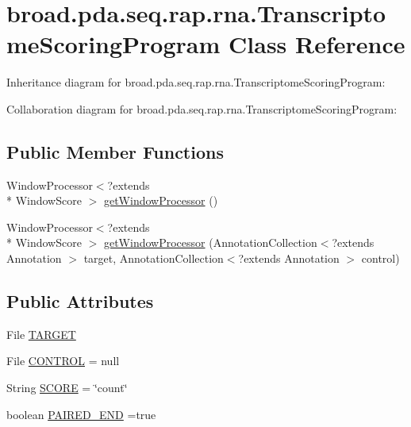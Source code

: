 \hypertarget{classbroad_1_1pda_1_1seq_1_1rap_1_1rna_1_1_transcriptome_scoring_program}{\section{broad.\+pda.\+seq.\+rap.\+rna.\+Transcriptome\+Scoring\+Program Class Reference}
\label{classbroad_1_1pda_1_1seq_1_1rap_1_1rna_1_1_transcriptome_scoring_program}
}


Inheritance diagram for broad.\+pda.\+seq.\+rap.\+rna.\+Transcriptome\+Scoring\+Program\+:


Collaboration diagram for broad.\+pda.\+seq.\+rap.\+rna.\+Transcriptome\+Scoring\+Program\+:
\subsection*{Public Member Functions}
\begin{DoxyCompactItemize}
\item 
Window\+Processor$<$?extends \\*
Window\+Score $>$ \hyperlink{classbroad_1_1pda_1_1seq_1_1rap_1_1rna_1_1_transcriptome_scoring_program_a2b57a53668040cd3a9c9411dc9dce7be}{get\+Window\+Processor} ()
\item 
Window\+Processor$<$?extends \\*
Window\+Score $>$ \hyperlink{classbroad_1_1pda_1_1seq_1_1rap_1_1rna_1_1_transcriptome_scoring_program_a696ae45b0c3c70b0a160c8c3d8913f2f}{get\+Window\+Processor} (Annotation\+Collection$<$?extends Annotation $>$ target, Annotation\+Collection$<$?extends Annotation $>$ control)
\end{DoxyCompactItemize}
\subsection*{Public Attributes}
\begin{DoxyCompactItemize}
\item 
File \hyperlink{classbroad_1_1pda_1_1seq_1_1rap_1_1rna_1_1_transcriptome_scoring_program_a00f43c9c9e8e2762acfc1517b87d8608}{T\+A\+R\+G\+E\+T}
\item 
File \hyperlink{classbroad_1_1pda_1_1seq_1_1rap_1_1rna_1_1_transcriptome_scoring_program_a90bcb800638d3bc689301daff0be1397}{C\+O\+N\+T\+R\+O\+L} = null
\item 
String \hyperlink{classbroad_1_1pda_1_1seq_1_1rap_1_1rna_1_1_transcriptome_scoring_program_ae8b26a43c0791ea615a151ffeb6f1656}{S\+C\+O\+R\+E} = \char`\"{}count\char`\"{}
\item 
boolean \hyperlink{classbroad_1_1pda_1_1seq_1_1rap_1_1rna_1_1_transcriptome_scoring_program_a6e56bb9000e47238f5182d7a50f0a10b}{P\+A\+I\+R\+E\+D\+\_\+\+E\+N\+D} =true
\end{DoxyCompactItemize}
